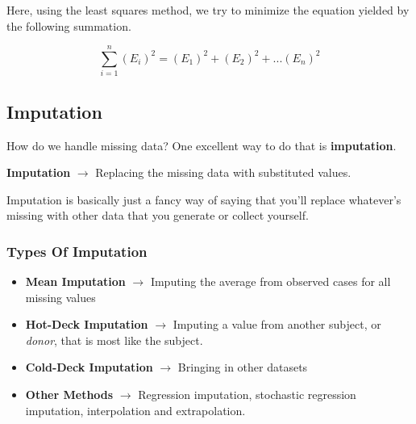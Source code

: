 \documentclass[english, 10pt]{article}
\begin{document}
{


}

\hfill \break Here, using the least squares method, we try to minimize the equation yielded by the following summation. 

$$ \sum_{i=1}^{n} {(E_i)^2} = (E_1)^2 + (E_2)^2 + ... (E_n)^2$$

\subsection{Imputation}

How do we handle missing data? One excellent way to do that is \textbf{imputation}.\\

\begin{tcolorbox}[title=Definition:,colframe=red!75!black,colback=red!5!white,arc=0pt,fonttitle=\bfseries]
\textbf{Imputation} $\rightarrow$ Replacing the missing data with substituted values.
\end{tcolorbox}

\hfill \break Imputation is basically just a fancy way of saying that you'll replace whatever's missing with other data that you generate or collect yourself.

\subsubsection{Types Of Imputation}

\begin{itemize}
	\item \textbf{Mean Imputation} $\rightarrow$ Imputing the average from observed cases for all missing values
	\item \textbf{Hot-Deck Imputation} $\rightarrow$ Imputing a value from another subject, or \textit{donor}, that is most like the subject.
	\item \textbf{Cold-Deck Imputation} $\rightarrow$ Bringing in other datasets
	\item \textbf{Other Methods} $\rightarrow$ Regression imputation, stochastic regression imputation, interpolation and extrapolation.
\end{itemize}
\end{document}
